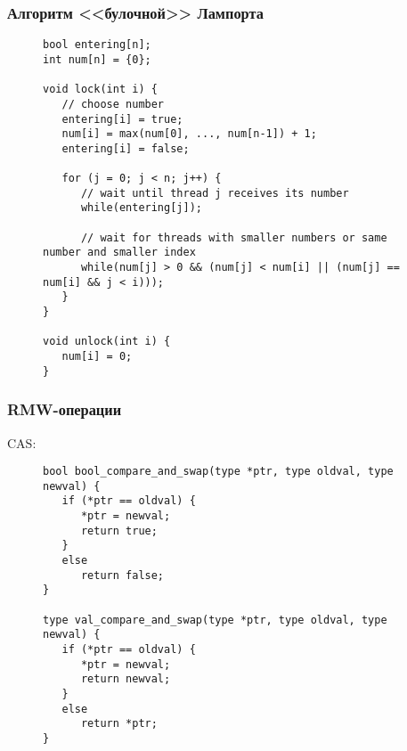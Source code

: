 \documentclass[aspectratio=169, pdf, 8pt, unicode]{beamer}
\begin{document}
\begin{frame}[fragile]
\frametitle{Алгоритм <<булочной>> Лампорта}
\begin{figure}[H]
\centering
\begin{minipage}{0.8\textwidth}
\begin{verbatim}
bool entering[n];
int num[n] = {0};

void lock(int i) {
   // choose number
   entering[i] = true;
   num[i] = max(num[0], ..., num[n-1]) + 1;
   entering[i] = false;

   for (j = 0; j < n; j++) {
      // wait until thread j receives its number
      while(entering[j]);

      // wait for threads with smaller numbers or same number and smaller index
      while(num[j] > 0 && (num[j] < num[i] || (num[j] == num[i] && j < i)));
   }
}

void unlock(int i) {
   num[i] = 0;
}
\end{verbatim}
\end{minipage}
\end{figure}
\end{frame}

\begin{frame}[fragile]
\frametitle{RMW-операции}
CAS:
\begin{figure}[H]
\centering
\begin{minipage}{0.8\textwidth}
\begin{verbatim}
bool bool_compare_and_swap(type *ptr, type oldval, type newval) {
   if (*ptr == oldval) {
      *ptr = newval;
      return true;
   }
   else
      return false;
}

type val_compare_and_swap(type *ptr, type oldval, type newval) {
   if (*ptr == oldval) {
      *ptr = newval;
      return newval;
   }
   else
      return *ptr;
}
\end{verbatim}
\end{minipage}
\end{figure}
\end{frame}
\end{document}
